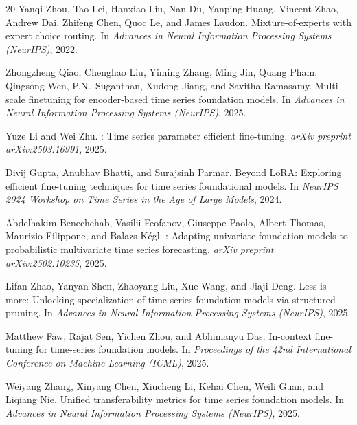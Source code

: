 \documentclass{article}
\begin{document}
\begin{thebibliography}{20}
Yanqi Zhou, Tao Lei, Hanxiao Liu, Nan Du, Yanping Huang, Vincent Zhao, Andrew Dai, Zhifeng Chen, Quoc Le, and James Laudon.
\newblock Mixture-of-experts with expert choice routing.
\newblock In \textit{Advances in Neural Information Processing Systems (NeurIPS)}, 2022.

Zhongzheng Qiao, Chenghao Liu, Yiming Zhang, Ming Jin, Quang Pham, Qingsong Wen, P.N.~Suganthan, Xudong Jiang, and Savitha Ramasamy.
\newblock Multi-scale finetuning for encoder-based time series foundation models.
\newblock In \textit{Advances in Neural Information Processing Systems (NeurIPS)}, 2025.

Yuze Li and Wei Zhu.
: Time series parameter efficient fine-tuning.
\newblock \textit{arXiv preprint arXiv:2503.16991}, 2025.

Divij Gupta, Anubhav Bhatti, and Surajsinh Parmar.
\newblock Beyond {LoRA}: Exploring efficient fine-tuning techniques for time series foundational models.
\newblock In \textit{NeurIPS 2024 Workshop on Time Series in the Age of Large Models}, 2024.

Abdelhakim Benechehab, Vasilii Feofanov, Giuseppe Paolo, Albert Thomas, Maurizio Filippone, and Balazs K\'{e}gl.
: Adapting univariate foundation models to probabilistic multivariate time series forecasting.
\newblock \textit{arXiv preprint arXiv:2502.10235}, 2025.

Lifan Zhao, Yanyan Shen, Zhaoyang Liu, Xue Wang, and Jiaji Deng.
\newblock Less is more: Unlocking specialization of time series foundation models via structured pruning.
\newblock In \textit{Advances in Neural Information Processing Systems (NeurIPS)}, 2025.

Matthew Faw, Rajat Sen, Yichen Zhou, and Abhimanyu Das.
\newblock In-context fine-tuning for time-series foundation models.
\newblock In \textit{Proceedings of the 42nd International Conference on Machine Learning (ICML)}, 2025.

Weiyang Zhang, Xinyang Chen, Xiucheng Li, Kehai Chen, Weili Guan, and Liqiang Nie.
\newblock Unified transferability metrics for time series foundation models.
\newblock In \textit{Advances in Neural Information Processing Systems (NeurIPS)}, 2025.


\end{thebibliography}
\end{document}
